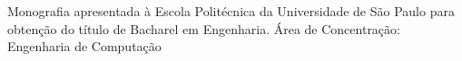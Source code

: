 {\large
  Monografia apresentada à Escola Politécnica da Universidade de São Paulo para obtenção do título de Bacharel em Engenharia.\newline
  \newline
  Área de Concentração:\newline
  Engenharia de Computação\newline
}

